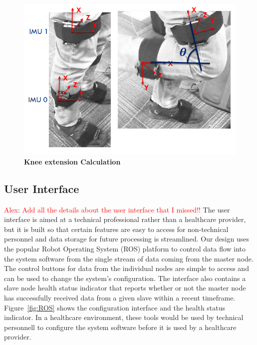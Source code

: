 \documentclass[conference]{IEEEtran}
\newcommand{\utodo}[2]{ {\textcolor{red} {#1}}: {\textcolor{red} {#2}}}
\begin{document}
\begin{figure}[h]
  \centering
  \includegraphics[width=0.8\columnwidth]{figs/knees}
  \caption{{\bf Knee extension Calculation}}
  \label{fig:knees}
\end{figure}

\subsection{User Interface}
\utodo{Alex}{Add all the details about the user interface that I missed!!}
The user interface is aimed at a technical professional rather than a healthcare provider,
but it is built so that certain features are easy to access for non-technical personnel
and data storage for future processing is streamlined. Our design uses the popular Robot
Operating System (ROS) platform to control data flow into the system software from the
single stream of data coming from the master node. The control buttons for data from the
individual nodes are simple to access and can be used to change the system's
configuration. The interface also contains a slave node health status indicator that
reports whether or not the master node has successfully received data from a given slave
within a recent timeframe. Figure~\ref{fig:ROS} shows the configuration interface and the
health status indicator. In a healthcare environment, these tools would be used by
technical personnell to configure the system software before it is used by a healthcare
provider. 
\end{document}
